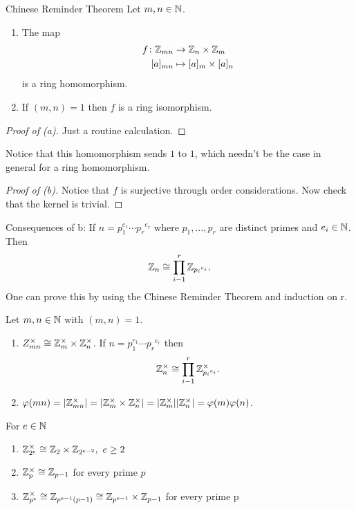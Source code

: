 \documentclass[11pt,leqno,oneside]{amsart}
\newcommand{\isom}{\mathrel{\cong}}
\newcommand{\primedecomposition}[3]{#1_1^{#2_1} \cdots {#1_{#3}}^{#2_{#3}}}
\begin{document}
\begin{prop*}[1.2.3]{Chinese Reminder Theorem}
  Let \(m,n \in {\mathbb N}\).
  \begin{enumerate}
  \item[(a)] The map
    \begin{align*}
      f \colon {\mathbb Z}_{mn} &\to {\mathbb Z}_n \times {\mathbb Z}_m\\
      [a]_{mn}&\mapsto [a]_m \times [a]_n
    \end{align*}
    is a ring homomorphism.
  \item[(b)] If \((m,n)=1\) then \(f\) is a ring isomorphism.
  \end{enumerate}
\end{prop*}
\begin{proof}[Proof of (a)]
  Just a routine calculation.
\end{proof}
Notice that this homomorphism sends \(1\) to \(1\), which needn't be the case in
general for a ring homomorphism.
\begin{proof}[Proof of (b)]
  Notice that \(f\) is surjective through order considerations. Now check that
  the kernel is trivial.
\end{proof}
Consequences of b: If \(n=\primedecomposition{p}{e}{r}\) where
\(p_1,\ldots,p_r\) are distinct primes and \(e_i \in {\mathbb N}\). Then
\[\Z_n \isom \prod_{i-1}^r \Z_{{p_i}^{e_i}}.\]
One can prove this by using the Chinese Reminder Theorem and induction on r.
\begin{cor*}[1.2.4]
  Let \(m,n \in {\mathbb N}\) with \((m,n)=1\).
  \begin{enumerate}
  \item[(a)] \(Z_{mn}^\times \isom \Z_m^\times \times \Z_n^\times\). If
    \(n=\primedecomposition{p}{e}{r}\) then
    \[\Z_n^\times \isom \prod_{i-1}^r \Z^\times_{{p_i}^{e_i}}.\]
  \item[(b)]
    \(\varphi(mn)=|{\mathbb Z}_{mn}^\times|=|{\mathbb Z}_{m}^\times\times
    {\mathbb Z}_{n}^\times|=|{\mathbb Z}_{m}^\times||{\mathbb Z}_{n}^\times|=\varphi(m)\varphi(n)\).
  \end{enumerate}
\end{cor*}
\begin{prop*}[1.2.5]
  For \(e \in {\mathbb N}\)
  \begin{enumerate}
    \item[(a)] \(\Z_{2^e}^\times \isom \Z_2 \times \Z_{2^{e-2}},\ e \ge 2\)
    \item[(b)] \(\Z_p^\times \isom \Z_{p-1}\) for every prime \(p\)
    \item[(c)] \(\Z_{p^e}^\times \isom \Z_{p^{e-1}(p-1)} \isom \Z_{p^{e-1}} \times \Z_{p-1} \) for every prime p
  \end{enumerate}
\end{prop*}
\end{document}
